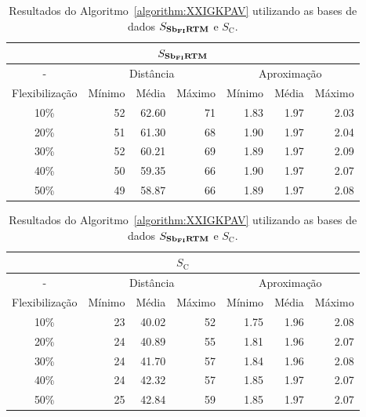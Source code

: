 \begin{table}[!htb]
  \caption{Resultados do Algoritmo~\ref{algorithm:XXIGKPAV} utilizando as bases de dados $S_{\textbf{Sb\textsubscript{FI}RTM}}{}$ e $S_{\text{C}}$.}
  \label{table:EXRPXQLG}
  \centering
  \begin{tabular}{|c|r|r|r|r|r|r|}
    \hline
    \multicolumn{7}{|c|}{$S_{\textbf{Sb\textsubscript{FI}RTM}}{}$}                                                                     \\ \hline
      -            & \multicolumn{3}{c|}{Distância}             & \multicolumn{3}{c|}{Aproximação}           \\ \hline
    Flexibilização & Mínimo       & Média        & Máximo       & Mínimo       & Média        & Máximo       \\ \hline  
    10\%           & 52           & 62.60        & 71           & 1.83         & 1.97         & 2.03         \\ \hline
    20\%           & 51           & 61.30        & 68           & 1.90         & 1.97         & 2.04         \\ \hline
    30\%           & 52           & 60.21        & 69           & 1.89         & 1.97         & 2.09         \\ \hline
    40\%           & 50           & 59.35        & 66           & 1.90         & 1.97         & 2.07         \\ \hline
    50\%           & 49           & 58.87        & 66           & 1.89         & 1.97         & 2.08         \\ \hline    
  \end{tabular}

  \vspace{5mm}

  \begin{tabular}{|c|r|r|r|r|r|r|}
    \hline
    \multicolumn{7}{|c|}{$S_{\text{C}}$}                                                                     \\ \hline
      -            & \multicolumn{3}{c|}{Distância}             & \multicolumn{3}{c|}{Aproximação}           \\ \hline
    Flexibilização & Mínimo       & Média        & Máximo       & Mínimo       & Média        & Máximo       \\ \hline  
    10\%           & 23           & 40.02        & 52           & 1.75         & 1.96         & 2.08         \\ \hline
    20\%           & 24           & 40.89        & 55           & 1.81         & 1.96         & 2.07         \\ \hline
    30\%           & 24           & 41.70        & 57           & 1.84         & 1.96         & 2.08         \\ \hline
    40\%           & 24           & 42.32        & 57           & 1.85         & 1.97         & 2.07         \\ \hline
    50\%           & 25           & 42.84        & 59           & 1.85         & 1.97         & 2.07         \\ \hline    
  \end{tabular}
\end{table}

